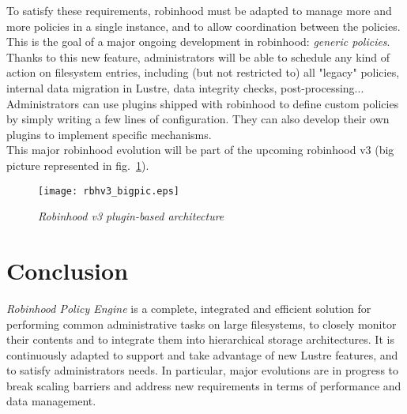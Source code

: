 \documentclass[conference]{IEEEtran}
\begin{document}
To satisfy these requirements, robinhood must be adapted to manage more and more policies in a single instance,
and to allow coordination between the policies. This is the goal of a major ongoing development in robinhood: {\it generic policies}.
Thanks to this new feature, administrators will be able to schedule any kind of action on filesystem entries, including (but not restricted to) all "legacy" policies, internal data migration in Lustre, data integrity checks, post-processing... Administrators can use plugins shipped with robinhood to define custom policies by simply writing a few lines of configuration. They can also develop their own plugins to implement specific mechanisms. \\
This major robinhood evolution will be part of the upcoming robinhood v3 (big picture represented in fig.~\ref{fig:rbhv3}).
\begin{figure}[here]
\centering
\texttt{[image: rbhv3\_bigpic.eps]}
\caption{\it Robinhood v3 plugin-based architecture}
\label{fig:rbhv3}
\end{figure}

\vfill
\break

\section{Conclusion}

\emph{Robinhood Policy Engine} is a complete, integrated and efficient solution
for performing common administrative tasks on large filesystems, to closely
monitor their contents and to integrate them into hierarchical storage
architectures.
It is continuously adapted to support and take advantage of new Lustre features, and to satisfy administrators needs. In par\-ti\-cu\-lar, major evolutions are in progress to break scaling barriers and address new requirements in terms of performance and data management.





\end{document}
